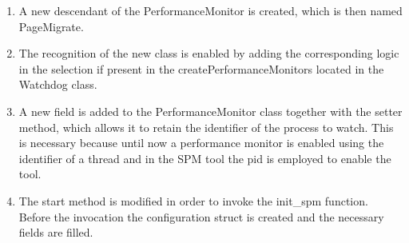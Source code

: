 \begin{enumerate}
	\item A new descendant of the PerformanceMonitor is created, which is then named PageMigrate.
	\item The recognition of the new class is enabled by adding the corresponding logic in the selection if present in the createPerformanceMonitors located in the Watchdog class.
	\item A new field is added to the PerformanceMonitor class together with the setter method, which allows it to retain the identifier of the process to watch. This is necessary because until now a performance monitor is enabled using the identifier of a thread and in the SPM tool the pid is employed to enable the tool.
	\item The start method is modified in order to invoke the init\_spm function. Before the invocation the configuration struct is created and the necessary fields are filled.
\end{enumerate}
